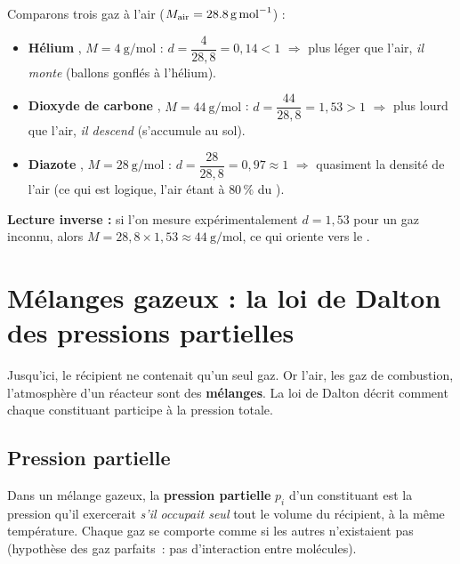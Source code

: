 \documentclass[11pt,a4paper]{article}
\newcommand{\GP}{gaz parfaits}
\begin{document}
\begin{exemple}
Comparons trois gaz à l'air ($M_{\text{air}}=\qty{28{,}8}{\gram\per\mole}$) :
\begin{itemize}[leftmargin=1.6em,topsep=2pt,itemsep=2pt]
  \item \textbf{Hélium} , $M=\qty{4}{\gram\per\mole}$ :
        $d=\dfrac{4}{28{,}8}=0{,}14<1$ $\Rightarrow$ plus léger que l'air, \emph{il monte} (ballons
        gonflés à l'hélium).
  \item \textbf{Dioxyde de carbone} , $M=\qty{44}{\gram\per\mole}$ :
        $d=\dfrac{44}{28{,}8}=1{,}53>1$ $\Rightarrow$ plus lourd que l'air, \emph{il descend} (s'accumule
        au sol).
  \item \textbf{Diazote} , $M=\qty{28}{\gram\per\mole}$ :
        $d=\dfrac{28}{28{,}8}=0{,}97\approx1$ $\Rightarrow$ quasiment la densité de l'air (ce qui est
        logique, l'air étant à $80\,\%$ du ).
\end{itemize}
\textbf{Lecture inverse :} si l'on mesure expérimentalement $d=1{,}53$ pour un gaz inconnu, alors
$M=28{,}8\times1{,}53\approx\qty{44}{\gram\per\mole}$, ce qui oriente vers le .
\end{exemple}

\section{Mélanges gazeux : la loi de Dalton des pressions partielles}
Jusqu'ici, le récipient ne contenait qu'un seul gaz. Or l'air, les gaz de combustion, l'atmosphère
d'un réacteur sont des \textbf{mélanges}. La loi de Dalton décrit comment chaque constituant participe
à la pression totale.

\subsection{Pression partielle}

\begin{definition}
Dans un mélange gazeux, la \textbf{pression partielle} $p_i$ d'un constituant est la pression qu'il
exercerait \emph{s'il occupait seul} tout le volume du récipient, à la même température. Chaque gaz se
comporte comme si les autres n'existaient pas (hypothèse des \GP\ : pas d'interaction entre molécules).
\end{definition}
\end{document}
